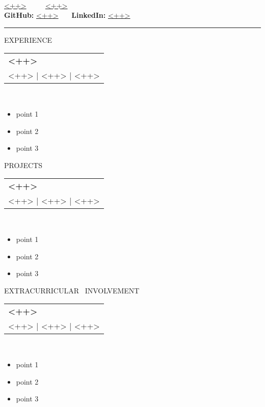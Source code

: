 \documentclass[11pt]{article}
\newcommand{\titl}[1]
{{\Large#1} \\}
\newcommand{\headerel}[4]
{\begin{tabular*}{\linewidth}{l}
  \rule{0pt}{17pt}
  {\large\textbf{#1}} \\
  { #2 | #3 | #4}
\end{tabular*}}
\newcommand{\info}[3]
{\vspace{0.5em}
  \begin{itemize}
  \parskip=0.1em
\item #1
\item #2
\item #3
\end{itemize}}
\begin{document}
\begin{center}

{\Huge <++>} \\ %
\vspace{0.2em}
\href{<++>}{<++>} \ \ \textbullet 
\ \ \href{<++>}{<++>} \\ %
\textbf{GitHub:} \href{<++>}{<++>} \ \textbullet \ \ 
\textbf{LinkedIn:} \href{<++>}{<++>} \\ %

\end{center}

\vspace{0.4em}
\hrule %
\begin{minipage}[t]{.65\textwidth} %
  \vspace{2em}
  \titl{\textsc{EXPERIENCE}} %
  \headerel{\textsc{<++>}}{<++>}{<++>}{<++>} \\  %
  \info{point 1}{point 2}{point 3} %

  \vspace{2em}
  \titl{\textsc{PROJECTS}} %
  \headerel{\textsc{<++>}}{<++>}{<++>}{<++>} \\  %
  \info{point 1}{point 2}{point 3} %
    
  \vspace{2em}
  \titl{\textsc{EXTRACURRICULAR \ INVOLVEMENT}} %
  \headerel{\textsc{<++>}}{<++>}{<++>}{<++>} \\  %
  \info{point 1}{point 2}{point 3} %
\end{minipage} \hspace{0.4em} %
\end{document}
